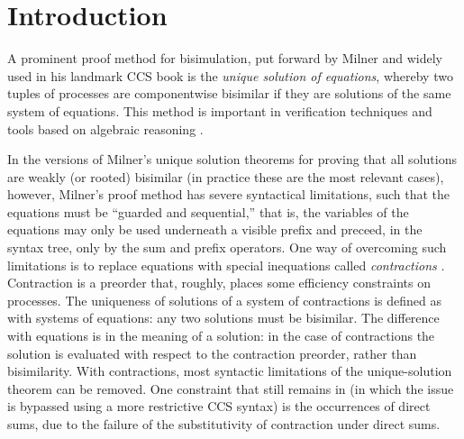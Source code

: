 \section{Introduction}

A prominent proof method for bisimulation, put forward by Milner and widely used in his
landmark CCS book \cite{Mil89} is the
\emph{unique solution of equations}, whereby two tuples of processes are
componentwise bisimilar if they are solutions 
of the same system of equations.
This method is important in verification techniques and tools
based on algebraic reasoning \cite{BaeBOOK,theoryAndPractice}. 

In the versions of Milner's unique solution theorems for proving that all
solutions are weakly (or rooted) bisimilar (in practice these are the most
relevant cases), however,
Milner's proof method has severe syntactical limitations, such that
the equations must be ``guarded and sequential,'' that is, the
variables of the equations may only be used underneath a visible
prefix and preceed, in the syntax tree, only by the sum and prefix operators.
One way of overcoming such limitations is to replace equations
 with special inequations called
\emph{contractions} \cite{sangiorgi2015equations,sangiorgi2017equations}. Contraction is a
preorder that, roughly, places some efficiency
constraints on processes.  The uniqueness of solutions of a system of contractions
is defined as with systems of equations: any two solutions must be bisimilar.
The difference with equations is in the meaning of a solution:
in the case of contractions the solution is evaluated with respect to
the contraction preorder, rather than bisimilarity. 
With contractions, most syntactic limitations of the unique-solution theorem can be
removed.  One constraint that still remains in
\cite{sangiorgi2017equations} (in which the issue is bypassed using a more
restrictive CCS syntax)
is the occurrences of direct sums, due to the failure of the
substitutivity of contraction under direct sums.

